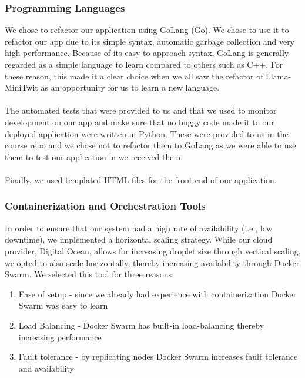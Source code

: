 \documentclass{article}
\begin{document}
\subsubsection{Programming Languages}We chose to refactor our application using GoLang (Go). We chose to use it to refactor our app due to its simple syntax, automatic garbage collection and very high performance. Because of its easy to approach syntax, GoLang is generally regarded as a simple language to learn compared to others such as C++. For these reason, this made it a clear choice when we all saw the refactor of Llama-MiniTwit as an opportunity for us to learn a new language.
\\\\
The automated tests that were provided to us and that we used to monitor development on our app and make sure that no buggy code made it to our deployed application were written in Python. These were provided to us in the course repo and we chose not to refactor them to GoLang as we were able to use them to test our application in we received them.
\\\\
Finally, we used templated HTML files for the front-end of our application.

\subsubsection{Containerization and Orchestration Tools}
In order to ensure that our system had a high rate of availability (i.e., low downtime), we implemented a horizontal scaling strategy. While our cloud provider, Digital Ocean, allows for increasing droplet size through vertical scaling, we opted to also scale horizontally, thereby increasing availability through Docker Swarm. We selected this tool for three reasons:

\begin{enumerate}
    \item Ease of setup - since we already had experience with containerization Docker Swarm was easy to learn
    \item Load Balancing - Docker Swarm has built-in load-balancing thereby increasing performance
    \item Fault tolerance - by replicating nodes Docker Swarm increases fault tolerance and availability
\end{enumerate}
\end{document}
